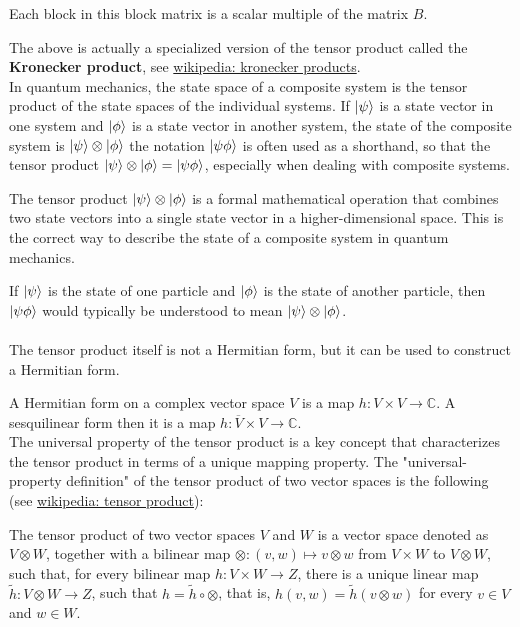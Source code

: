 Each block in this block matrix is a scalar multiple of the matrix $B$.

The above is actually a specialized version of the tensor product called the
\textbf{Kronecker product}, see
\href{https://en.wikipedia.org/wiki/Kronecker_product}{wikipedia: kronecker products}.
\\

In quantum mechanics, the state space of a composite system is
the tensor product of the state spaces of the individual systems.
If $\ket{\psi}$ is a state vector in one system and $\ket{\phi}$ is a state vector in another system,
the state of the composite system is $\ket{\psi} \otimes \ket{\phi}$
the notation $\ket{\psi \phi}$ is often used as a shorthand,
so that the tensor product $\ket{\psi} \otimes \ket{\phi} = \ket{\psi \phi}$,
especially when dealing with composite systems.

The tensor product $\ket{\psi} \otimes \ket{\phi}$ is a formal mathematical operation that combines
two state vectors into a single state vector in a higher-dimensional space.
This is the correct way to describe the state of a composite system in quantum mechanics.

If $\ket{\psi}$ is the state of one particle and $\ket{\phi}$ is the state of
another particle, then $\ket{\psi \phi}$ would typically be understood to mean
$\ket{\psi} \otimes \ket{\phi}$.
\\~\\

The tensor product itself is not a Hermitian form, but it can be used to construct a Hermitian form.

A Hermitian form on a complex vector space $V$ is a map
$h: V \times V \to \mathbb{C}$.
A sesquilinear form then it is a map $h: \overline{V} \times V \to \mathbb{C}$.
\\

The universal property of the tensor product is a key concept that
characterizes the tensor product in terms of a unique mapping property.
The "universal-property definition" of the tensor product of two vector spaces is the following
(see \href{https://en.wikipedia.org/wiki/Tensor_product#Universal_property}{wikipedia: tensor product}):

The tensor product of two vector spaces $V$ and $W$ is a vector space denoted as
$V\otimes W$, together with a bilinear map $\otimes : (v,w) \mapsto v\otimes w$
from $V\times W$ to $V\otimes W$, such that, for every bilinear map
$h : V\times W\to Z$, there is a unique linear map $\tilde{h} :V\otimes W\to Z$,
such that $h= \tilde{h} \circ \otimes$,
that is, $h(v,w) = \tilde{h} (v\otimes w)$ for every $v\in V$ and $w\in W$.


